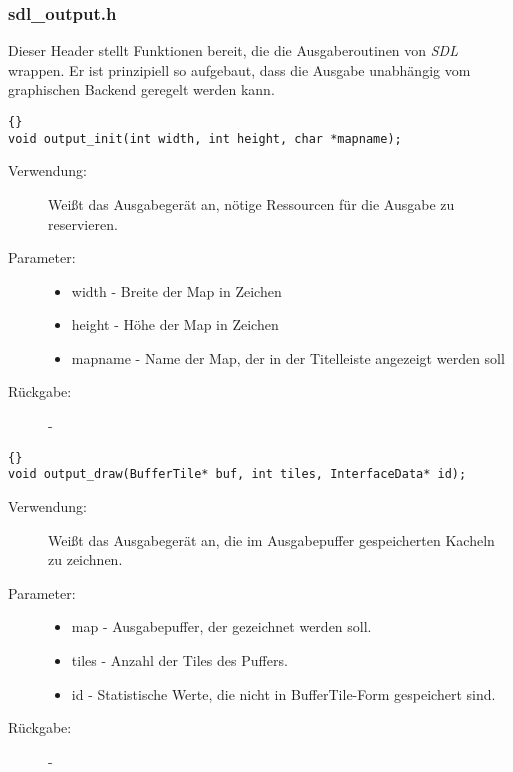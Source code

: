 \documentclass[11pt,a4paper,notitlepage]{report}
\begin{document}
	\newpage
	\subsubsection*{sdl\_output.h}
	Dieser Header stellt Funktionen bereit, die die Ausgaberoutinen von \textit{SDL} wrappen. Er ist prinzipiell so aufgebaut, dass die Ausgabe unabhängig vom graphischen Backend geregelt werden kann.
	
		\begin{lstlisting}[caption=output\_init]{}
void output_init(int width, int height, char *mapname);
		\end{lstlisting}
		
	\begin{description}
		\item[Verwendung:] Weißt das Ausgabegerät an, nötige Ressourcen für die Ausgabe zu reservieren.
		\item[Parameter:] \hfill
		\begin{itemize}
			\item width - Breite der Map in Zeichen
			\item height - Höhe der Map in Zeichen
			\item mapname - Name der Map, der in der Titelleiste angezeigt werden soll
		\end{itemize}
		\item[Rückgabe:] -
	\end{description}
	
		\begin{lstlisting}[caption=output\_draw]{}
void output_draw(BufferTile* buf, int tiles, InterfaceData* id);
		\end{lstlisting}
		
	\begin{description}
		\item[Verwendung:] Weißt das Ausgabegerät an, die im Ausgabepuffer gespeicherten Kacheln zu zeichnen.
		\item[Parameter:] \hfill
		\begin{itemize}
			\item map - Ausgabepuffer, der gezeichnet werden soll.
			\item tiles - Anzahl der Tiles des Puffers.
			\item id - Statistische Werte, die nicht in BufferTile-Form gespeichert sind.
		\end{itemize}
		\item[Rückgabe:] -
	\end{description}
	
\end{document}
